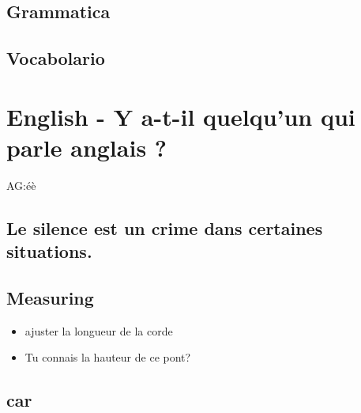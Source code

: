 \subsection{Grammatica}



\subsection{Vocabolario}



\begin{vocabolario}
\end{vocabolario}

\section{English - Y a-t-il quelqu'un qui parle anglais ?}
AG:\'e\`e
\subsection{Le silence est un crime dans certaines situations.}

\subsection{Measuring}

\begin{itemize}

\item ajuster la longueur de la corde

\item Tu connais la hauteur de ce pont?

\end{itemize}

\subsection{car}

